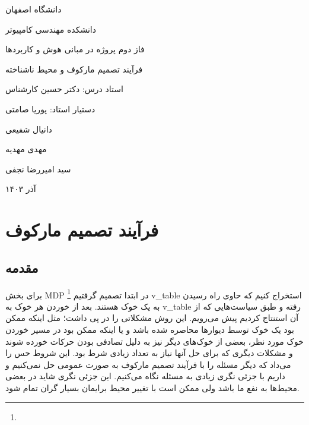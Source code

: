 \documentclass[11pt, a4paper, oneside]{report}
\begin{document}
	
	\begin{titlepage}
		\centering
		\par
	
		\vspace{1cm}
    \par %
		
		\vspace{5mm}
		{\LARGE دانشگاه اصفهان}\par
		\vspace{5mm}
		{\Large دانشکده مهندسی کامپیوتر}\par
		
		\vspace{2cm}
		
		{\Large فاز دوم پروژه در مبانی هوش و کاربردها}\par
		\vspace{1cm}
		{\Huge فرآیند تصمیم مارکوف و محیط ناشناخته}\par
		
		
		\vspace{2cm}
		{\Large استاد درس: دکتر حسین کارشناس}\par
		\vspace{0.5cm}
		{\Large دستیار استاد: پوریا صامتی}
		
		\vspace{1.2cm}
		{\Large دانیال شفیعی}\par
		{\Large مهدی مهدیه}\par
		{\Large سید امیررضا نجفی}\par
		
		\vspace{2cm}
		
		{\large آذر ۱۴۰۳\par}
	\end{titlepage}
	\tableofcontents
	\newpage

	
		\chapter{فرآیند تصمیم مارکوف}
		\section{مقدمه}
	 برای بخش  MDP
	 \footnote{}
	  در ابتدا تصمیم گرفتیم v\_table  استخراج کنیم که حاوی راه رسیدن به یک خوک هستند. بعد از خوردن هر خوک به v\_table  رفته و طبق سیاست‌هایی که از آن استنتاج کردیم پیش می‌رویم.  این روش مشکلاتی را در پی داشت؛ مثل اینکه ممکن بود یک خوک توسط دیوارها محاصره شده باشد و یا اینکه ممکن بود در مسیر خوردن خوک مورد نظر، بعضی از خوک‌های دیگر نیز به دلیل تصادفی بودن حرکات خورده شوند و مشکلات دیگری که برای حل آنها نیاز به تعداد زیادی شرط بود. این شروط حس را می‌داد که دیگر مسئله را با فرآیند تصمیم مارکوف به صورت عمومی حل نمی‌کنیم و داریم با جزئی نگری زیادی به مسئله نگاه می‌کنیم. این جزئی نگری شاید در بعضی محیط‌ها به نفع ما باشد ولی ممکن است با تغییر محیط برایمان بسیار گران تمام شود.
	 
\end{document}

